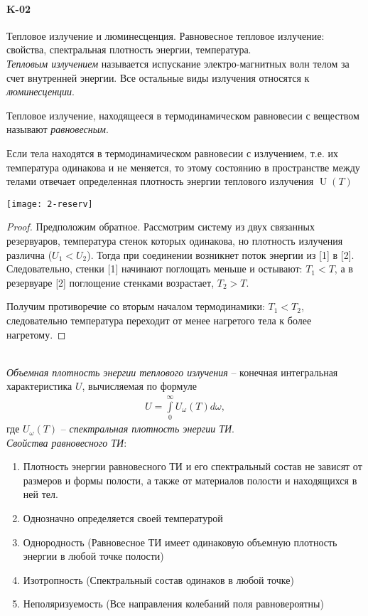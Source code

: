 \documentclass[__main__.tex]{subfiles}
\begin{document}
\paragraph{K-02}
Тепловое излучение и люминесценция. Равновесное тепловое излучение: свойства, спектральная плотность энергии, температура.\\

\textit{Тепловым излучением} называется испускание электро-магнитных волн телом за счет внутренней энергии. Все остальные виды излучения относятся к \textit{люминесценции}.

Тепловое излучение, находящееся в термодинамическом равновесии с веществом называют \textit{равновесным}.

\begin{statement}
Если тела находятся в термодинамическом равновесии с излучением, т.е. их температура одинакова и не меняется, то этому состоянию в пространстве между телами отвечает определенная плотность энергии теплового излучения $\operatorname{U}(T)$
\end{statement}
\begin{minipage}{.35\linewidth}
\texttt{[image: 2-reserv]}
\end{minipage}
\hfill
\begin{minipage}{.6\linewidth}
\begin{proof}
Предположим обратное. Рассмотрим систему из двух связанных резервуаров, температура стенок которых одинакова, но плотность излучения различна ($U_1<U_2$). Тогда при соединении возникнет поток энергии из [1] в [2]. Следовательно, стенки [1] начинают поглощать меньше и остывают: $T_1 < T$, а в резервуаре [2] поглощение стенками возрастает, $T_2 > T$.

Получим противоречие со вторым началом термодинамики: $T_1<T_2$, следовательно температура переходит от менее нагретого тела к более нагретому.
\end{proof}
\end{minipage}\\

\textit{Объемная плотность энергии теплового излучения} -- конечная интегральная характеристика $U$, вычисляемая по формуле
\begin{gather*}
U=\int\limits_{0}^{\infty}U_\omega(T)d\omega,
\end{gather*}
где $U_\omega(T)$ -- \textit{спектральная плотность энергии ТИ}.\\

\textit{Свойства равновесного ТИ}:
\begin{enumerate}
\item
Плотность энергии равновесного ТИ и его спектральный состав не зависят от размеров и формы полости, а также от материалов полости и находящихся в ней тел.
\item
Однозначно определяется своей температурой
\item
Однородность (Равновесное ТИ имеет одинаковую объемную плотность энергии в любой точке полости)
\item
Изотропность (Спектральный состав одинаков в любой точке)
\item
Неполяризуемость (Все направления колебаний поля равновероятны)
\end{enumerate}
\end{document}
